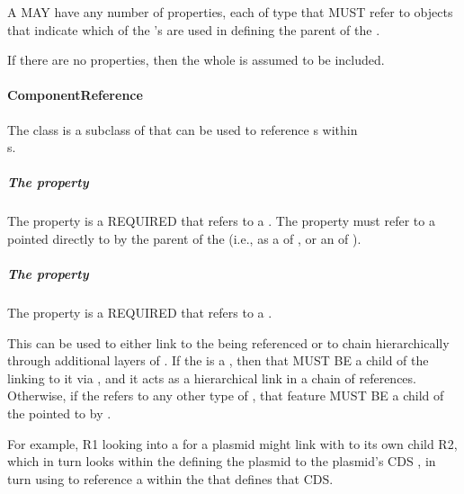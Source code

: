 A  MAY have any number of  properties, each of type  that MUST refer to   objects that indicate which  of the  's  are used in defining the parent of the .

If there are no  properties, then the whole  is assumed to be included. 


\paragraph{ComponentReference}
\label{sec:ComponentReference}

The  class is a subclass of  that can be used to reference s within\\ s. 

\subparagraph{The  property}\label{sec:inChildOf}

The  property is a REQUIRED  that refers to a . 
The  property must refer to a  pointed directly to by the parent of the  (i.e., as a  of , or an  of ). 

\subparagraph{The  property}\label{sec:hasFeature:CR}

The  property is a REQUIRED  that refers to a .

This can be used to either link to the  being referenced or to chain hierarchically through additional layers of .
If the  is a , then that  MUST BE a child of the  linking to it via , and it acts as a hierarchical link in a chain of references.
Otherwise, if the  refers to any other type of , that feature MUST BE a child of the  pointed to by .

For example,  R1 looking into a  for a plasmid might link with  to its own child  R2, which in turn looks within the  defining the plasmid to the plasmid's CDS , in turn using  to reference a  within the  that defines that CDS.



